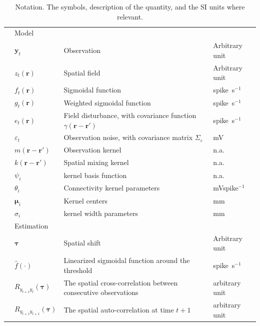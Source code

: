 \documentclass[10pt,twocolumn,twoside]{IEEEtran}
\begin{document}
\begin {table}[t]
\begin{center}
{\begin{tabular}{llll}
	& Model&& \\
	& $\mathbf{y}_t$ & Observation & Arbitrary unit \\
	& $z_t(\mathbf{r})$ & Spatial field & Arbitrary unit \\ 
	& $f_t(\mathbf{r})$ & Sigmoidal function & spike~s$^{-1}$ \\ 
	& $g_t(\mathbf{r})$ & Weighted sigmoidal function & spike~s$^{-1}$ \\
 	& $e_t(\mathbf{r})$ & Field disturbance, with covariance function $\gamma(\mathbf{r}-\mathbf{r'})$  & spike~s$^{-1}$ \\
 	& $\varepsilon_t$ & Observation noise, with covariance matrix $\Sigma_{\varepsilon}$  & mV \\  
 	& $m(\mathbf{r}-\mathbf{r'})$ & Observation kernel& n.a. \\  
 	& $k(\mathbf{r}-\mathbf{r'})$ & Spatial mixing kernel& n.a. \\ 
	&$\psi_i$&kernel basis function&n.a.\\
	&$\theta_i$ &Connectivity kernel parameters&mVspike$^{-1}$ \\ 
	& $\boldsymbol\mu_i$ &Kernel centers& mm \\  
	& $\sigma_{i}$ &kernel width parameters&mm \\ 
	& Estimation&& \\
 	& $\boldsymbol\tau$ &Spatial shift& Arbitrary unit \\
  & $\hat{f}(\cdot)$ &Linearized sigmoidal function around the threshold& spike~s$^{-1}$ \\  
  & $R_{y_{t+1}y_t}(\boldsymbol{\tau}) $ &The spatial cross-correlation between consecutive observations& arbitrary unit \\  
  & $R_{y_{t+1}y_{t+1}}(\boldsymbol{\tau})$ & The spatial auto-correlation at time $t+1$& arbitrary unit \\    
 	\hline \hline
	\end{tabular}}
 \caption {Notation. 	The symbols, description of the quantity, and the SI units where relevant.} 
 \label{table:Notation}
 \end{center}
 \end {table}
\end{document}
